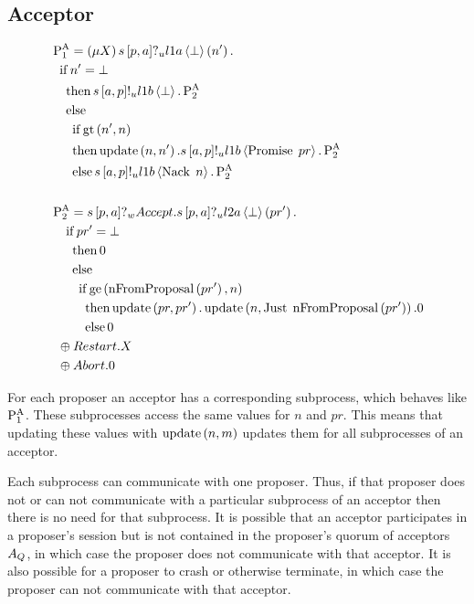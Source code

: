 \subsection{Acceptor}
\begin{align*}
&\PaOne = \Mu{X} \ReceiveUnreliableP{s}{\ProposerIndex}{\AcceptorIndex}{\LOneA}{\bot}{n'} .\\
&\Indent{1}\If{n' = \bot}\\
&\Indent{2}\Then{\SendUnreliableP{s}{\AcceptorIndex}{\ProposerIndex}{\LOneB}{\bot}.\PaTwo}\\
&\Indent{2}\Else{\\
&\Indent{3}\If{\greaterThan{n'}{n}}\\
&\Indent{3}\Then{\update{n}{n'}}.\SendUnreliableP{s}{\AcceptorIndex}{\ProposerIndex}{\LOneB}{\Promise{pr}}.\PaTwo\\
&\Indent{3}\Else{\SendUnreliableP{s}{\AcceptorIndex}{\ProposerIndex}{\LOneB}{\Nack{n}}.\PaTwo}
}
\\\\
&\PaTwo = \ReceiveWeaklyP{s}{\ProposerIndex}{\AcceptorIndex}{\Accept . \ReceiveUnreliableP{s}{\ProposerIndex}{\AcceptorIndex}{\LTwoA}{\bot}{pr'} .\\
&\Indent{2}\If{pr' = \bot}\\
&\Indent{3}\Then{\End}\\
&\Indent{3}\Else{\\
&\Indent{4}\If{\greaterEqual{\nFromProposal{pr'}}{n}}\\
&\Indent{5}\Then{\update{pr}{pr'} . \update{n}{\Just{\nFromProposal{pr'}}}.\End}\\
&\Indent{5}\Else{\End}}\\
&\Indent{1} \oplus \Restart.X\\
&\Indent{1} \oplus \Abort.\End}
\end{align*}

For each proposer an acceptor has a corresponding subprocess, which behaves like $\operatorname{P^{A}_{1}}$.
These subprocesses access the same values for $n$ and $pr$.
This means that updating these values with $\operatorname{update} \left(n, m\right)$ updates them for all subprocesses of an acceptor.

Each subprocess can communicate with one proposer.
Thus, if that proposer does not or can not communicate with a particular subprocess of an acceptor then there is no need for that subprocess.
It is possible that an acceptor participates in a proposer's session but is not contained in the proposer's quorum of acceptors $A_Q$, in which case the proposer does not communicate with that acceptor.
It is also possible for a proposer to crash or otherwise terminate, in which case the proposer can not communicate with that acceptor.

